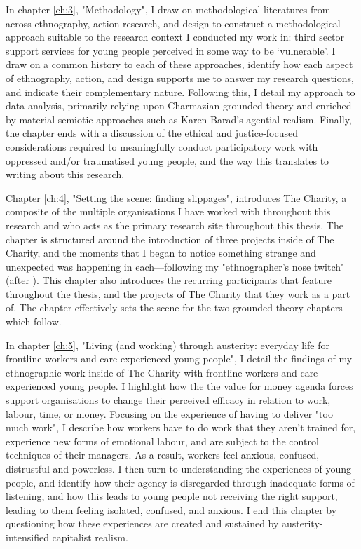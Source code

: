 In chapter \ref{ch:3}, "Methodology", I draw on methodological literatures from across ethnography, action research, and design to construct a methodological approach suitable to the research context I conducted my work in: third sector support services for young people perceived in some way to be `vulnerable'. I draw on a common history to each of these approaches, identify how each aspect of ethnography, action, and design supports me to answer my research questions, and indicate their complementary nature. Following this, I detail my approach to data analysis, primarily relying upon Charmazian grounded theory and enriched by material-semiotic approaches such as Karen Barad's agential realism. Finally, the chapter ends with a discussion of the ethical and justice-focused considerations required to meaningfully conduct participatory work with oppressed and/or traumatised young people, and the way this translates to writing about this research. 

Chapter \ref{ch:4}, "Setting the scene: finding slippages", introduces The Charity, a composite of the multiple organisations I have worked with throughout this research and who acts as the primary research site throughout this thesis. The chapter is structured around the introduction of three projects inside of The Charity, and the moments that I began to notice something strange and unexpected was happening in each—following my "ethnographer's nose twitch" (after \citet[p.  610]{star_ethnography_1999}). This chapter also introduces the recurring participants that feature throughout the thesis, and the projects of The Charity that they work as a part of. The chapter effectively sets the scene for the two grounded theory chapters which follow.

In chapter \ref{ch:5}, "Living (and working) through austerity: everyday life for frontline workers and care-experienced young people", I detail the findings of my ethnographic work inside of The Charity with frontline workers and care-experienced young people. I highlight how the the value for money agenda forces support organisations to change their perceived efficacy in relation to work, labour, time, or money. Focusing on the experience of having to deliver "too much work", I describe how workers have to do work that they aren't trained for, experience new forms of emotional labour, and are subject to the control techniques of their managers. As a result, workers feel anxious, confused, distrustful and powerless.  I then turn to understanding the experiences of young people, and identify how their agency is disregarded through inadequate forms of listening, and how this leads to young people not receiving the right support, leading to them feeling isolated, confused, and anxious. I end this chapter by questioning how these experiences are created and sustained by austerity-intensified capitalist realism.

